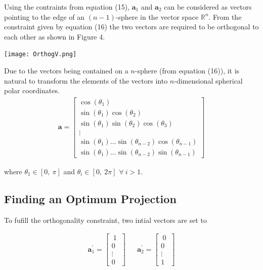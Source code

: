 \documentclass[a4paper,11pt,twoside]{article}
\begin{document}
Using the contraints from equation (15), $\bm{a}_1$ and $\bm{a}_2$ can be considered as vectors pointing to the edge of an $(n-1)$-sphere in the vector space $\mathbb{R}^n$. From the constraint given by equation (16) the two vectors are required to be orthogonal to each other as shown in Figure 4. 
\begin{center}
\texttt{[image: OrthogV.png]}

\end{center}

Due to the vectors being contained on a $n$-sphere (from equation (16)), it is natural to transform the elements of the vectors into $n$-dimensional spherical polar coordinates. 
\begin{align}
\bm{a} = \begin{bmatrix}
           \cos(\theta_1) \\
           \sin(\theta_1)\cos(\theta_2) \\
           \sin(\theta_1)\sin(\theta_2)\cos(\theta_3) \\
           \vdots \\
		   \sin(\theta_1) \dotsc \sin(\theta_{n-2})\cos(\theta_{n-1}) \\
           \sin(\theta_1) \dotsc \sin(\theta_{n-2})\sin(\theta_{n-1})
           \end{bmatrix}
\end{align}

where $\theta_1 \in [0,\ \pi]$ and $\theta_i \in [0,\ 2\pi]$ $\forall \ i > 1$. 

\subsection{Finding an Optimum Projection}

To fufill the orthogonality constraint, two intial vectors are set to

\begin{align}
\bm{a}_1^{\prime} = \begin{bmatrix}
           \ 1 \ \\
           0 \\
           \vdots \\
           0
           \end{bmatrix} 
           && 
\bm{a}_2^{\prime} = \begin{bmatrix}
           \ 0 \ \\
           0 \\
           \vdots \\
           1
           \end{bmatrix} 
\end{align}
\end{document}
